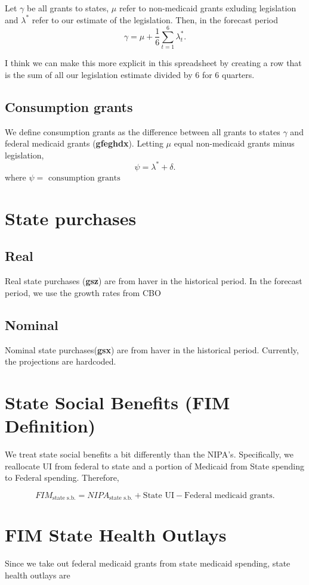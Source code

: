 \documentclass[a4paper]{article}
\begin{document}
Let $\gamma$ be all grants to states, $\mu$ refer to non-medicaid grants exluding legislation and $\lambda^{*}$ refer to our estimate 
of the legislation. Then, in the forecast period 
\[
  \boxed{\gamma = \mu + \frac{1}{6} \sum_{t=1}^{6} \lambda^{*}_{t}}
.\] 

\remark
I think we can make this more explicit in this spreadsheet by creating a row that is the sum of all our legislation
estimate divided by 6 for 6 quarters. 

\subsection{Consumption grants}
We define consumption grants as the difference between all grants to states $\gamma$ and federal medicaid
grants (\textbf{gfeghdx}). Letting $\mu$ equal non-medicaid grants minus legislation, 
\[
\psi = \lambda^{*} + \delta
.\] 
where $\psi = \text{ consumption grants }$
\section{State purchases}
\subsection{Real}
Real state purchases (\textbf{gsz}) are from haver in the historical period.
In the forecast period, we use the growth rates from CBO
\subsection{Nominal}
Nominal state purchases(\textbf{gsx}) are from haver in the historical period. 
\remark
Currently, the projections are hardcoded. 
\section{State Social Benefits (FIM Definition)}
We treat state social benefits a bit differently than the NIPA's. Specifically, we reallocate UI
from federal to state and a portion of Medicaid from State spending to Federal spending.
Therefore, 

\[
  FIM_{\text{state s.b.}} = NIPA_{\text{state s.b.}} + \text{State UI}
  - \text{Federal medicaid grants}
.\] 
\section{FIM State Health Outlays}
Since we take out federal medicaid grants from state medicaid spending, state health outlays are 
\end{document}
